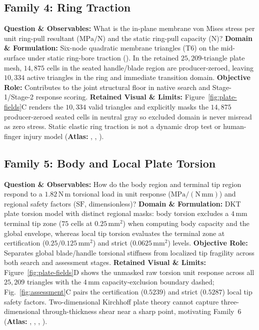 \subsection{Family 4: Ring Traction}
\label{subsec:family-ring}
\textbf{Question \& Observables:} What is the in-plane membrane von Mises stress per unit ring-pull resultant ($\mathrm{MPa/N}$) and the static ring-pull capacity ($\mathrm{N}$)?
\textbf{Domain \& Formulation:} Six-node quadratic membrane triangles (T6) on the mid-surface under static ring-bore traction (). In the retained $25{,}209$-triangle plate mesh, $14{,}875$ cells in the seated handle/blade region are producer-zeroed, leaving $10{,}334$ active triangles in the ring and immediate transition domain.
\textbf{Objective Role:} Contributes to the joint structural floor in native search and Stage-1/Stage-2 response scoring.
\textbf{Retained Visual \& Limits:} Figure~\ref{fig:plate-fields}C renders the $10{,}334$ valid triangles and explicitly masks the $14{,}875$ producer-zeroed seated cells in neutral gray so excluded domain is never misread as zero stress. Static elastic ring traction is not a dynamic drop test or human-finger injury model (\textbf{Atlas:} , , ).

\subsection{Family 5: Body and Local Plate Torsion}
\label{subsec:family-torsion}
\textbf{Question \& Observables:} How do the body region and terminal tip region respond to a $1.82\,\mathrm{N\,m}$ torsional load in unit response ($\mathrm{MPa/(N\,mm)}$) and regional safety factors ($\mathrm{SF}$, dimensionless)?
\textbf{Domain \& Formulation:} DKT plate torsion model with distinct regional masks: body torsion excludes a $4\,\mathrm{mm}$ terminal tip zone ($75$ cells at $0.25\,\mathrm{mm}^2$) when computing body capacity and the global envelope, whereas local tip torsion evaluates the terminal zone at certification ($0.25/0.125\,\mathrm{mm}^2$) and strict ($0.0625\,\mathrm{mm}^2$) levels.
\textbf{Objective Role:} Separates global blade/handle torsional stiffness from localized tip fragility across both search and assessment stages.
\textbf{Retained Visual \& Limits:} Figure~\ref{fig:plate-fields}D shows the unmasked raw torsion unit response across all $25{,}209$ triangles with the $4\,\mathrm{mm}$ capacity-exclusion boundary dashed; Fig.~\ref{fig:assessment}C pairs the certification ($0.5239$) and strict ($0.5287$) local tip safety factors. Two-dimensional Kirchhoff plate theory cannot capture three-dimensional through-thickness shear near a sharp point, motivating Family~6 (\textbf{Atlas:} , , , ).

